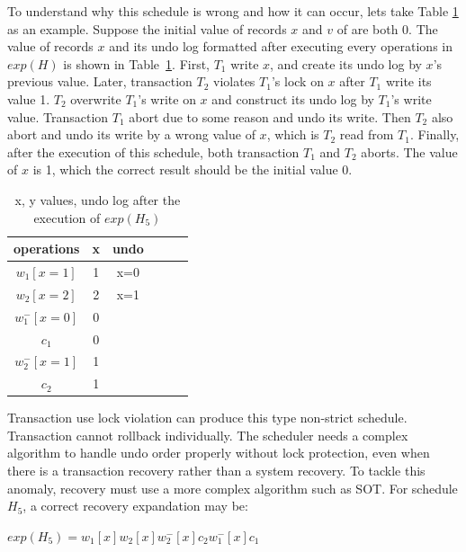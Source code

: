 \documentclass[conference]{IEEEtran}
\begin{document}
To understand why this schedule is wrong and how it can occur, lets take Table \ref{tbl:x_y_vlues} as an example.  
Suppose the initial value of records ${x}$ and ${v}$ of are both 0.
The value of records ${x}$  and its undo log formatted after executing every operations in $exp(H)$ is shown in Table~\ref{tbl:x_y_vlues}.
First, ${T_1}$ write ${x}$, and create its undo log by ${x}$'s previous value.
Later, transaction ${T_2}$ violates ${T_1}$'s lock on ${x}$ after ${T_1}$ write its value 1.
 ${T_2}$ overwrite ${T_1}$'s write on ${x}$ and construct its undo log by ${T_1}$'s write value.
Transaction ${T_1}$ abort due to some reason and undo its write.
Then ${T_2}$ also abort and undo its write by a wrong value of ${x}$, which is ${T_2}$ read from ${T_1}$.
Finally, after the execution of this schedule, both transaction ${T_1}$ and ${T_2}$ aborts.
The value of ${x}$ is 1, which the correct result should be the initial value 0.


\begin{table}[htb]
  \centering
  \begin{tabular}{|c|c|c|c|c|c|}
  \hline
operations & x & undo   \\
  \hline
  \hline
  $w_1[x=1]$ & 1 & x=0  \\
  \hline
  $w_2[x=2]$ & 2  & x=1   \\
  \hline
  $w^-_1[x=0]$ & 0  &   \\
  \hline

  $c_1$ & 0  &   \\
  \hline
  $w^-_2[x=1]$ & 1  &    \\
  \hline
  $c_2$ & 1  &  \\
  \hline
  \end{tabular}
\caption{x, y values, undo log after the execution of ${exp(H_5)}$}
\label{tbl:x_y_vlues}
\end{table}

Transaction use lock violation can produce this type non-strict schedule.
Transaction cannot rollback individually.
The scheduler needs a complex algorithm to handle undo order properly without lock protection,  even when there is a transaction recovery rather than a system recovery.
To tackle this anomaly, recovery must use a more complex algorithm such as SOT\cite{UnifyCR:journals/is/AlonsoVABASW94}.
For schedule ${H_5}$, a correct recovery expandation may be:
\begin{center}
  ${exp(H_5) =  w_1[x]w_2[x]w^-_2[x]c_2w^-_1[x]c_1}$
\end{center}
\end{document}
